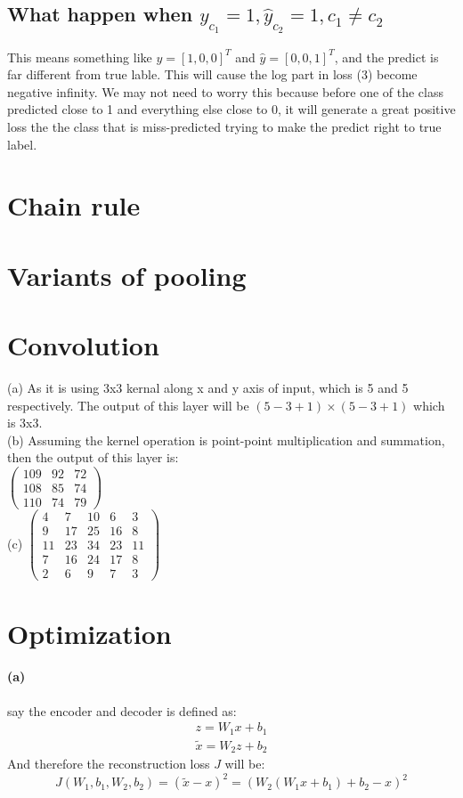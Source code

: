 \documentclass{article}
\begin{document}
\subsection{What happen when $y_{c_1}=1, \hat{y}_{c_2}=1, c_1 \neq c_2$}
This means something like $y = [1, 0, 0]^T$ and $\hat{y} = [0,0,1]^T$, and the predict is far different from true lable. This will cause the log part in loss (3) become negative infinity. We may not need to worry this because before one of the class predicted close to 1 and everything else close to 0, it will generate a great positive loss the the class that is miss-predicted trying to make the predict right to true label.
\section{Chain rule}
\section{Variants of pooling}
\section{Convolution}
(a) As it is using 3x3 kernal along x and y axis of input, which is 5 and 5 respectively. The output of this layer will be $(5-3+1)\times(5-3+1)$ which is 3x3.\\
(b) Assuming the kernel operation is point-point multiplication and summation, then the output of this layer is:\\
$\begin{pmatrix}
  109 & 92 & 72 \\[0.4em]
  108 & 85 & 74 \\[0.4em]
  110 & 74 & 79
\end{pmatrix}$ \\
(c)
$\begin{pmatrix}
  4 & 7 & 10 & 6 & 3 \\[0.4em]
  9 & 17 & 25 & 16 & 8 \\[0.4em]
  11 & 23 & 34 & 23 & 11 \\[0.4em]
  7 & 16 & 24 & 17 & 8 \\[0.4em]
  2 & 6 & 9 &7 & 3
\end{pmatrix}$ \\


\section{Optimization}
\paragraph{(a)} say the encoder and decoder is defined as:
\begin{equation}
\begin{matrix}
z = W_1x + b_1 \\[0.4em]
\tilde{x} = W_2z + b_2
\end{matrix}
\end{equation}
And therefore the reconstruction loss $J$ will be:
\begin{equation}
J(W_1, b_1, W_2, b_2) = (\tilde{x}-x)^2 = (W_2(W_1x+b_1)+b_2-x)^2
\end{equation}
\end{document}
